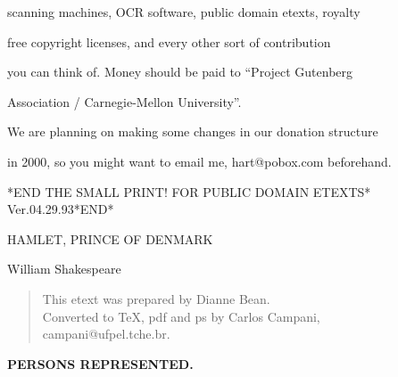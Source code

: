 \documentclass[12pt]{book}
\begin{document}
scanning machines, OCR software, public domain etexts, royalty

free copyright licenses, and every other sort of contribution

you can think of.  Money should be paid to ``Project Gutenberg

Association / Carnegie-Mellon University''.



We are planning on making some changes in our donation structure

in 2000, so you might want to email me, hart@pobox.com beforehand.



*END THE SMALL PRINT! FOR PUBLIC DOMAIN ETEXTS* \newline Ver.04.29.93*END*



\newpage



\vspace*{6cm}



\begin{center}

{\Huge HAMLET, PRINCE OF DENMARK}



\vspace*{3cm}



{\Large William Shakespeare}



\end{center}



\newpage



\begin{verse}

This etext was prepared by Dianne Bean. \\



Converted to \TeX, pdf and ps by Carlos Campani, \\

 campani@ufpel.tche.br.

\end{verse}



\newpage



\begin{center}

{\bf PERSONS REPRESENTED.}

\end{center}
\end{document}
